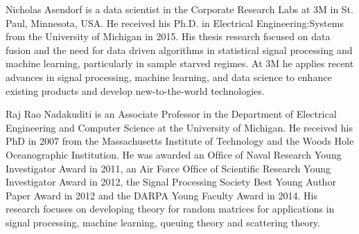 \documentclass[journal]{IEEEtran}
\begin{document}
%
\begin{IEEEbiography}{Nicholas
  Asendorf}
is a data scientist in the Corporate Research Labs at 3M in St. Paul, Minnesota, USA. He
received his Ph.D.  in Electrical Engineering:Systems from the University of Michigan in
2015. His thesis research focused on data fusion and the need for data driven algorithms
in statistical signal processing and machine learning, particularly in sample starved
regimes. At 3M he applies recent advances in signal processing, machine learning, and data
science to enhance existing products and develop new-to-the-world technologies.
\end{IEEEbiography}

\begin{IEEEbiography}{Raj
    Rao Nadakuditi}
 is an Associate Professor in the Department of Electrical Engineering
and Computer Science at the University of Michigan. He received his PhD in 2007 from the
Massachusetts Institute of Technology and the Woods Hole Oceanographic Institution. He was
awarded an Ofﬁce of Naval Research Young Investigator Award in 2011, an Air Force Ofﬁce of
Scientiﬁc Research Young Investigator Award in 2012, the Signal Processing Society Best
Young Author Paper Award in 2012 and the DARPA Young Faculty Award in 2014. His research
focuses on developing theory for random matrices for applications in signal processing,
machine learning, queuing theory and scattering theory.
\end{IEEEbiography}
\end{document}
